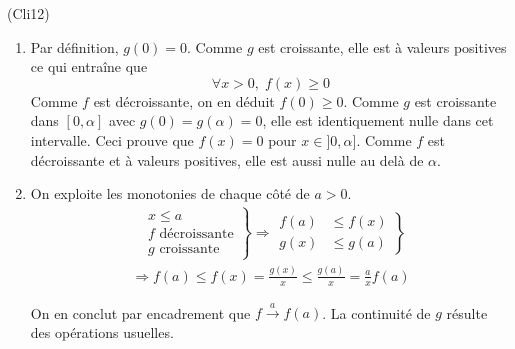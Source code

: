 \begin{tiny}(Cli12)\end{tiny} 
\begin{enumerate}
  \item Par définition, $g(0)=0$. Comme $g$ est croissante, elle est à valeurs positives ce qui entraîne que 
\begin{displaymath}
\forall x > 0,\; f(x)\geq 0  
\end{displaymath}
Comme $f$ est décroissante, on en déduit $f(0)\geq 0$.\newline
Comme $g$ est croissante dans $[0,\alpha]$ avec $g(0)=g(\alpha)=0$, elle est identiquement nulle dans cet intervalle. Ceci prouve que
$f(x)=0$ pour $x\in]0,\alpha]$. Comme $f$ est décroissante et à valeurs positives, elle est aussi nulle au delà de $\alpha$.

  \item On exploite les monotonies de chaque côté de $a > 0$.
\begin{multline*}
\left. 
\begin{aligned}
  &x \leq a \\ &f \text{ décroissante} \\ &g \text{ croissante}
\end{aligned}
\right\rbrace \Rightarrow
\left. 
\begin{aligned}
  f(a) &\leq f(x) \\ g(x) &\leq g(a)
\end{aligned}
\right\rbrace\\
\Rightarrow
f(a) \leq f(x) = \frac{g(x)}{x} \leq \frac{g(a)}{x} = \frac{a}{x} f(a)
\end{multline*}

On en conclut par encadrement que $f\xrightarrow{a} f(a)$. La continuité de $g$ résulte des opérations usuelles. 
\end{enumerate}

